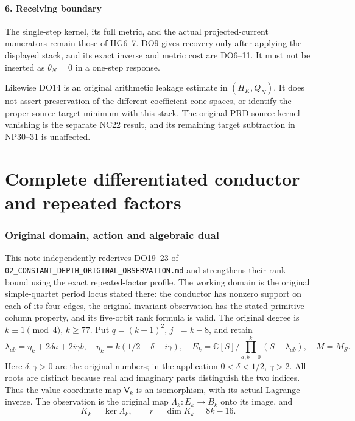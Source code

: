 \subsection{6. Receiving boundary}\label{pdepth:receiving-boundary}

The single-step kernel, its full metric, and the actual projected-current numerators remain those of HG6--7. DO9 gives recovery only after applying the displayed stack, and its exact inverse and metric cost are DO6--11. It must not be inserted as \(\theta_N=0\) in a one-step response.

Likewise DO14 is an original arithmetic leakage estimate in \((H_K,Q_N)\). It does not assert preservation of the different coefficient-cone spaces, or identify the proper-source target minimum with this stack. The original PRD source-kernel vanishing is the separate NC22 result, and its remaining target subtraction in NP30--31 is unaffected.


\endgroup

\clearpage\begingroup
\part*{Complete differentiated conductor and repeated factors}
\newcommand{\pdiffC}{\mathbb C}
\newcommand{\pdiffim}{\operatorname{im}}
\newcommand{\pdiffrank}{\operatorname{rank}}
\newcommand{\pdiffdiag}{\operatorname{diag}}
\newcommand{\pdiffSpan}{\operatorname{span}}



\section{Original domain, action and algebraic dual}
This note independently rederives DO19--23 of
\texttt{02\_CONSTANT\_DEPTH\_ORIGINAL\_OBSERVATION.md} and strengthens
their rank bound using the exact repeated-factor profile.  The working
domain is the original simple-quartet period locus stated there: the
conductor has nonzero support on each of its four edges, the original
invariant observation has the stated primitive-column property, and its
five-orbit rank formula is valid.  The original degree is
$k\equiv1\pmod4$, $k\ge77$.  Put $q=(k+1)^2$, $j_-=k-8$, and retain
\[
 \lambda_{ab}=\eta_k+2\delta a+2i\gamma b,\quad
 \eta_k=k(1/2-\delta-i\gamma),\quad
 E_k=\pdiffC[S]/\prod_{a,b=0}^k(S-\lambda_{ab}),
 \quad M=M_S.                                                   \tag{DC1}
\]
Here $\delta,\gamma>0$ are the original numbers; in the application
$0<\delta<1/2$, $\gamma>2$.  All roots are distinct because real and
imaginary parts distinguish the two indices.  Thus the value-coordinate
map $\mathsf V_k$ is an isomorphism, with its actual Lagrange inverse.
The observation is the original map $\Lambda_k:E_k\to B_k$ onto its
image, and
\[
 K_k=\ker\Lambda_k,\qquad r=\dim K_k=8k-16.                      \tag{DC2}
\]

